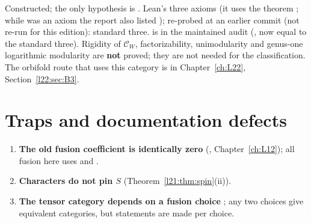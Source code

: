 \begin{status}
Constructed; the only hypothesis is . Lean's three axioms (it uses the theorem ; while  was an axiom the report also listed ); re-probed at an earlier commit (not re-run for this edition): standard three.
 is in the maintained audit (, now equal to the standard three). Rigidity of $\mathcal C_W$, factorizability, unimodularity and genus-one
logarithmic modularity are \textbf{not} proved; they are not needed for the classification. The orbifold route that uses
this category is in Chapter~\ref{ch:L22}, Section~\ref{l22:sec:B3}.
\end{status}

\section{Traps and documentation defects}\label{l21:sec:defects}

\begin{warning}[title={Traps}]
\begin{enumerate}
\item \textbf{The old fusion coefficient is identically zero} (, Chapter~\ref{ch:L12}); all fusion here uses
   and .
\item \textbf{Characters do not pin $S$} (Theorem~\ref{l21:thm:spin}(ii)).
\item \textbf{The tensor category depends on a fusion choice} ; any two choices give equivalent categories, but
  statements are made per choice.
\end{enumerate}
\end{warning}


